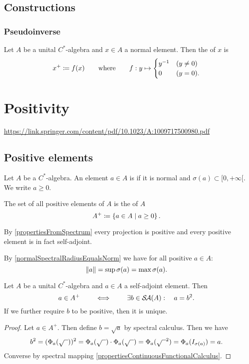\subsection{Constructions}
\subsubsection{Pseudoinverse}
\begin{definition}
Let $A$ be a unital $C^*$-algebra and $x\in A$ a normal element. Then the  of $x$ is 
\[ x^+ \coloneqq f(x) \qquad\text{where}\qquad f: y \mapsto \begin{cases}
y^{-1} & (y \neq 0) \\ 0 & (y = 0).
\end{cases} \]
\end{definition}

\section{Positivity}
\url{https://link.springer.com/content/pdf/10.1023/A:1009717500980.pdf}
\subsection{Positive elements}
\begin{definition}
Let $A$ be a $C^*$-algebra. An element $a\in A$ is  if it is normal and $\sigma(a) \subset [0,+\infty[$. We write $a\geq 0$.

The set of all positive elements of $A$ is the  of $A$
\[ A^+ \coloneqq \left\{ a\in A \;\middle|\; a\geq 0 \right\}. \]
\end{definition}
By \ref{propertiesFromSpectrum} every projection is positive and every positive element is in fact self-adjoint.

By \ref{normalSpectralRadiusEqualsNorm} we have for all positive $a\in A$:
\[ \lVert a\rVert = \sup\sigma(a) = \max\sigma(a). \]

\begin{proposition}
Let $A$ be a unital $C^*$-algebra and $a\in A$ a self-adjoint element. Then
\[ a\in A^+ \qquad\iff\qquad \exists b\in \mathop{\mathcal{S}\hspace{-0.15em}\mathcal{A}}\nolimits(A):\quad a = b^2. \]
If we further require $b$ to be positive, then it is unique.
\end{proposition}
\begin{proof}
Let $a\in A^+$. Then define $b = \sqrt{a}$ by spectral calculus. Then we have
\[ b^2 = (\Phi_a(\sqrt{\mbox{\;\;}}))^2 = \Phi_a(\sqrt{\mbox{\;\;}})\cdot \Phi_a(\sqrt{\mbox{\;\;}}) = \Phi_a(\sqrt{\mbox{\;\;}}^2) = \Phi_a(I_{\sigma(a)}) = a. \]
Converse by spectral mapping \ref{propertiesContinuousFunctionalCalculus}.
\end{proof}

